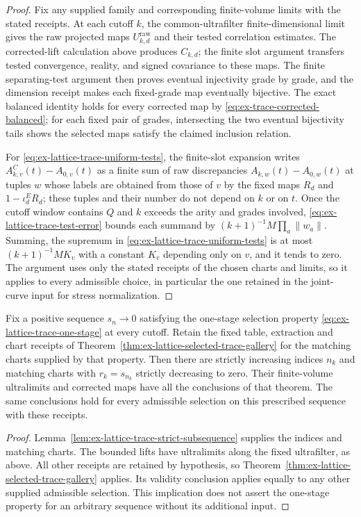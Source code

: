 \begin{proof}
Fix any supplied family and corresponding finite-volume limits with the
stated receipts. At each cutoff $k$, the
common-ultrafilter finite-dimensional limit gives the raw projected maps $U^{\mathrm{raw}}_{k,d}$ and their tested
correlation estimates. The corrected-lift calculation above produces
$C_{k,d}$; the finite slot argument transfers tested convergence, reality,
and signed covariance to these maps. The finite separating-test argument
then proves eventual injectivity grade by grade, and the dimension receipt
makes each fixed-grade map eventually bijective. The exact balanced identity
holds for every corrected map by \eqref{eq:ex-trace-corrected-balanced}; for
each fixed pair of grades, intersecting the two eventual bijectivity tails
shows the selected maps satisfy the claimed inclusion relation.

For \eqref{eq:ex-lattice-trace-uniform-tests}, the finite-slot expansion
writes $A^C_{k,v}(t)-A_{0,v}(t)$ as a finite sum of raw discrepancies
$A_{k,w}(t)-A_{0,w}(t)$ at tuples $w$ whose labels are obtained from those
of $v$ by the fixed maps $R_d$ and $1-\iota^E_dR_d$; these tuples and their
number do not depend on $k$ or on $t$.  Once the cutoff window contains
$Q$ and $k$ exceeds the arity and grades involved,
\eqref{eq:ex-lattice-trace-test-error} bounds each summand by
$(k+1)^{-1}M\prod_a\|w_a\|$.  Summing, the supremum in
\eqref{eq:ex-lattice-trace-uniform-tests} is at most $(k+1)^{-1}MK_v$ with
a constant $K_v$ depending only on $v$, and it tends to zero. The argument
uses only the stated receipts of the chosen charts and limits, so it
applies to every admissible choice, in particular the one retained in the
joint-curve input for stress normalization.\end{proof}

\begin{corollary}
\label{cor:ex-lattice-prescribed-trace-gallery}
Fix a positive sequence $s_n\to0$ satisfying the one-stage selection
property \eqref{eq:ex-lattice-trace-one-stage} at every cutoff. Retain the
fixed table, extraction and chart receipts of
Theorem~\ref{thm:ex-lattice-selected-trace-gallery} for the matching
charts supplied by that property. Then there are strictly increasing
indices $n_k$ and matching charts with $r_k=s_{n_k}$ strictly decreasing
to zero. Their finite-volume ultralimits and corrected maps have all the
conclusions of that theorem. The same conclusions hold for every
admissible selection on this prescribed sequence with these receipts.
\end{corollary}
\begin{proof}
Lemma~\ref{lem:ex-lattice-trace-strict-subsequence} supplies the indices
and matching charts. The bounded lifts have ultralimits along the fixed
ultrafilter, as above. All other receipts are retained by
hypothesis, so Theorem~\ref{thm:ex-lattice-selected-trace-gallery} applies.
Its validity conclusion applies equally to any other supplied admissible
selection. This implication does not assert the one-stage property for
an arbitrary sequence without its additional input.
\end{proof}

